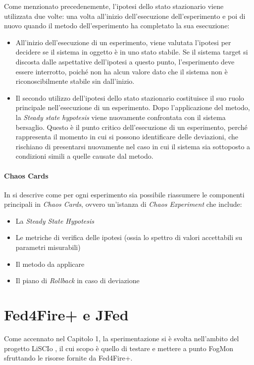         Come menzionato precedenemente, l'ipotesi dello stato stazionario viene utilizzata due volte: una volta all'inizio dell'esecuzione dell'esperimento e poi di nuovo quando il metodo dell'esperimento ha completato la sua esecuzione:
        \begin{itemize}
            \item All'inizio dell'esecuzione di un esperimento, viene valutata l'ipotesi per decidere se il sistema in oggetto è in uno stato stabile. Se il sistema target si discosta dalle aspettative dell'ipotesi a questo punto, l'esperimento deve essere interrotto, poiché non ha alcun valore dato che il sistema non è riconoscibilmente stabile sin dall'inizio.
            \item Il secondo utilizzo dell'ipotesi dello stato stazionario costituisce il suo ruolo principale nell'esecuzione di un esperimento. Dopo l'applicazione del metodo, la \textit{Steady state hypotesis} viene nuovamente confrontata con il sistema bersaglio. Questo è il punto critico dell'esecuzione di un esperimento, perché rappresenta il momento in cui si possono identificare delle deviazioni, che rischiano di presentarsi nuovamente nel caso in cui il sistema sia sottoposto a condizioni simili a quelle causate dal metodo.
        \end{itemize}
        \paragraph{Chaos Cards}
        In \cite{miles} si descrive come per ogni esperimento sia possibile riassumere le componenti principali in \textit{Chaos Cards}, ovvero un'istanza di \textit{Chaos Experiment} che include:
        \begin{itemize}
            \item La \textit{Steady State Hypotesis}
            \item Le metriche di verifica delle ipotesi (ossia lo spettro di valori accettabili su parametri misurabili)
            \item Il metodo da applicare
            \item Il piano di \textit{Rollback} in caso di deviazione
        \end{itemize}

    \section{Fed4Fire+ e JFed}
    Come accennato nel Capitolo 1, la sperimentazione si è svolta nell'ambito del progetto LiSCIo \cite{FogMon}, il cui scopo è quello di testare e mettere a punto FogMon sfruttando le risorse fornite da Fed4Fire+.
    
